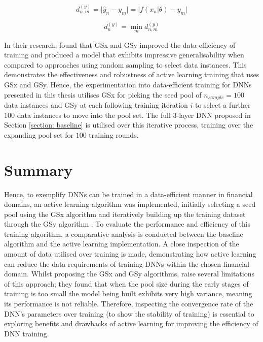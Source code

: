 \documentclass[a4paper, 11pt]{report}
\begin{document}
    \begin{equation}
        \label{eq: GSy-distance}
        d^{(y)}_{n, m} = \lvert \hat{y}_n - y_m \lvert = \lvert f( x_n \vert \theta ) - y_m \lvert
    \end{equation}
  
    \begin{equation}
        \label{eq: GSy-min}
        d^{(y)}_n = \min_m d^{(y)}_{n, m}
    \end{equation}


    In their research, \citet{wu-2019} found that GSx and GSy improved the data efficiency of training and produced a model that exhibits impressive generalisability when compared to approaches using random sampling to select data instances. This demonstrates the effectiveness and robustness of active learning training that uses GSx and GSy. Hence, the experimentation into data-efficient training for DNNs presented in this thesis utilises GSx for picking the seed pool of $n_{sample} = 100$ data instances and GSy at each following training iteration $i$ to select a further $100$ data instances to move into the pool set. The full $3$-layer DNN proposed in Section \ref{section: baseline} is utilised over this iterative process, training over the expanding pool set for $100$ training rounds.


    \section{Summary}

    Hence, to exemplify DNNs can be trained in a data-efficient manner in financial domains, an active learning algorithm was implemented, initially selecting a seed pool using the GSx algorithm and iteratively building up the training dataset through the GSy algorithm \citep{wu-2019}. To evaluate the performance and efficiency of this training algorithm, a comparative analysis is conducted between the baseline algorithm and the active learning implementation. A close inspection of the amount of data utilised over training is made, demonstrating how active learning can reduce the data requirements of training DNNs within the chosen financial domain. Whilst proposing the GSx and GSy algorithms, \citet{wu-2019} raise several limitations of this approach; they found that when the pool size during the early stages of training is too small the model being built exhibits very high variance, meaning its performance is not reliable. Therefore, inspecting the convergence rate of the DNN's parameters over training (to show the stability of training) is essential to exploring benefits and drawbacks of active learning for improving the efficiency of DNN training.
\end{document}
